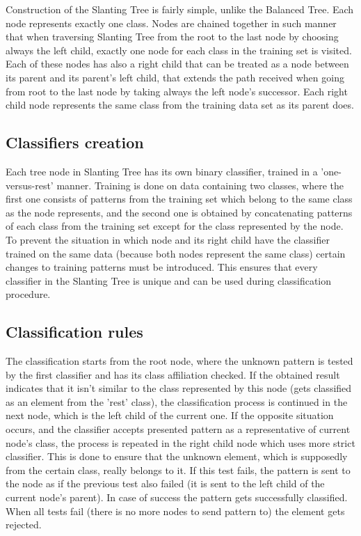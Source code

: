 Construction of the Slanting Tree is fairly simple, unlike the Balanced Tree. Each node represents exactly one class. Nodes are chained together in such manner that when traversing Slanting Tree from the root to the last node by choosing always the left child, exactly one node for each class in the training set is visited. Each of these nodes has also a right child that can be treated as a node between its parent and its parent's left child, that extends the path received when going from root to the last node by taking always the left node's successor. Each right child node represents the same class from the training data set as its parent does.

\subsection{Classifiers creation}

Each tree node in Slanting Tree has its own binary classifier, trained in a 'one-versus-rest' manner. Training is done on data containing two classes, where the first one consists of patterns from the training set which belong to the same class as the node represents, and the second one is obtained by concatenating patterns of each class from the training set except for the class represented by the node. To prevent the situation in which node and its right child have the classifier trained on the same data (because both nodes represent the same class) certain changes to training patterns must be introduced. This ensures that every classifier in the Slanting Tree is unique and can be used during classification procedure.


\subsection{Classification rules}

The classification starts from the root node, where the unknown pattern is tested by the first classifier and has its class affiliation checked. If the obtained result indicates that it isn't similar to the class represented by this node (gets classified as an element from the 'rest' class), the classification process is continued in the next node, which is the left child of the current one. If the opposite situation occurs, and the classifier accepts presented pattern as a representative of current node's class, the process is repeated in the right child node which uses more strict classifier. This is done to ensure that the unknown element, which is supposedly from the certain class, really belongs to it. If this test fails, the pattern is sent to the node as if the previous test also failed (it is sent to the left child of the current node's parent). In case of success the pattern gets successfully classified. When all tests fail (there is no more nodes to send pattern to) the element gets rejected.

